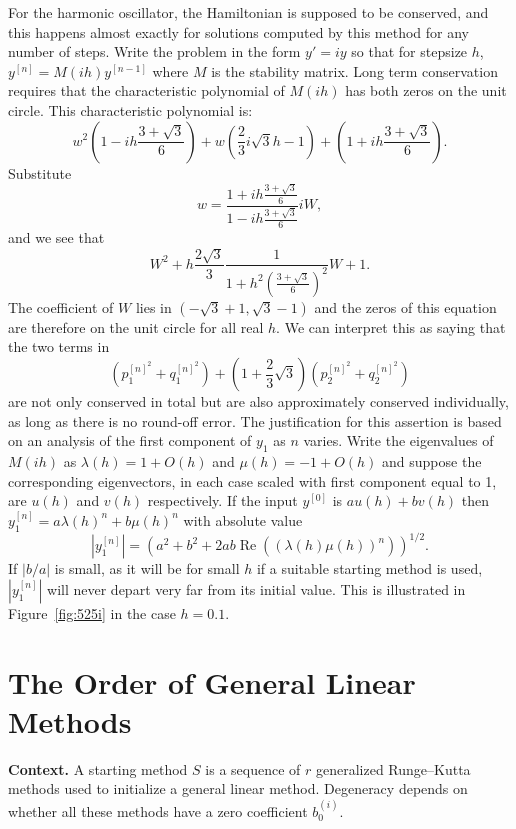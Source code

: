 \begin{definition}
For the harmonic oscillator, the Hamiltonian is supposed to be conserved, and this happens almost exactly for solutions computed by this method for any number of steps. Write the problem in the form $y' = iy$ so that for stepsize $h$, $y^{[n]} = M(ih)y^{[n-1]}$ where $M$ is the stability matrix. Long term conservation requires that the characteristic polynomial of $M(ih)$ has both zeros on the unit circle. This characteristic polynomial is:
\[
w^{2}\left(1 - ih\frac{3+\sqrt{3}}{6}\right) + w\left(\frac{2}{3}i\sqrt{3}h - 1\right) + \left(1 + ih\frac{3+\sqrt{3}}{6}\right).
\]
Substitute
\[
w = \frac{1 + ih\frac{3+\sqrt{3}}{6}}{1 - ih\frac{3+\sqrt{3}}{6}} iW,
\]
and we see that
\[
W^{2} + h\frac{2\sqrt{3}}{3} \frac{1}{1 + h^{2}\left(\frac{3+\sqrt{3}}{6}\right)^{2}} W + 1.
\]
The coefficient of $W$ lies in $(-\sqrt{3}+1, \sqrt{3}-1)$ and the zeros of this equation are therefore on the unit circle for all real $h$. We can interpret this as saying that the two terms in
\[
\left(p_{1}^{[n]^{2}} + q_{1}^{[n]^{2}}\right) + \left(1 + \frac{2}{3}\sqrt{3}\right)\left(p_{2}^{[n]^{2}} + q_{2}^{[n]^{2}}\right)
\]
are not only conserved in total but are also approximately conserved individually, as long as there is no round-off error. The justification for this assertion is based on an analysis of the first component of $y_{1}$ as $n$ varies. Write the eigenvalues of $M(ih)$ as $\lambda(h) = 1 + O(h)$ and $\mu(h) = -1 + O(h)$ and suppose the corresponding eigenvectors, in each case scaled with first component equal to 1, are $u(h)$ and $v(h)$ respectively. If the input $y^{[0]}$ is $au(h) + bv(h)$ then $y_{1}^{[n]} = a\lambda(h)^{n} + b\mu(h)^{n}$ with absolute value
\[
|y_{1}^{[n]}| = \left(a^{2} + b^{2} + 2ab\operatorname{Re}\left((\lambda(h)\mu(h))^{n}\right)\right)^{1/2}.
\]
If $|b/a|$ is small, as it will be for small $h$ if a suitable starting method is used, $|y_{1}^{[n]}|$ will never depart very far from its initial value. This is illustrated in Figure~\ref{fig:525i} in the case $h = 0.1$.
\end{definition}

\section{The Order of General Linear Methods}

\noindent\textbf{Context.}
A starting method $S$ is a sequence of $r$ generalized Runge--Kutta methods used to initialize a general linear method. Degeneracy depends on whether all these methods have a zero coefficient $b_0^{(i)}$.

